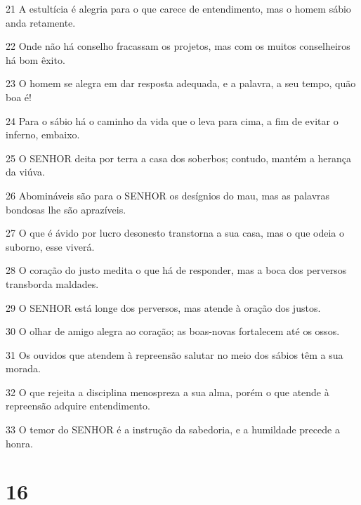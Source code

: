 \par 21 A estultícia é alegria para o que carece de entendimento, mas o homem sábio anda retamente.
\par 22 Onde não há conselho fracassam os projetos, mas com os muitos conselheiros há bom êxito.
\par 23 O homem se alegra em dar resposta adequada, e a palavra, a seu tempo, quão boa é!
\par 24 Para o sábio há o caminho da vida que o leva para cima, a fim de evitar o inferno, embaixo.
\par 25 O SENHOR deita por terra a casa dos soberbos; contudo, mantém a herança da viúva.
\par 26 Abomináveis são para o SENHOR os desígnios do mau, mas as palavras bondosas lhe são aprazíveis.
\par 27 O que é ávido por lucro desonesto transtorna a sua casa, mas o que odeia o suborno, esse viverá.
\par 28 O coração do justo medita o que há de responder, mas a boca dos perversos transborda maldades.
\par 29 O SENHOR está longe dos perversos, mas atende à oração dos justos.
\par 30 O olhar de amigo alegra ao coração; as boas-novas fortalecem até os ossos.
\par 31 Os ouvidos que atendem à repreensão salutar no meio dos sábios têm a sua morada.
\par 32 O que rejeita a disciplina menospreza a sua alma, porém o que atende à repreensão adquire entendimento.
\par 33 O temor do SENHOR é a instrução da sabedoria, e a humildade precede a honra.

\chapter{16}

